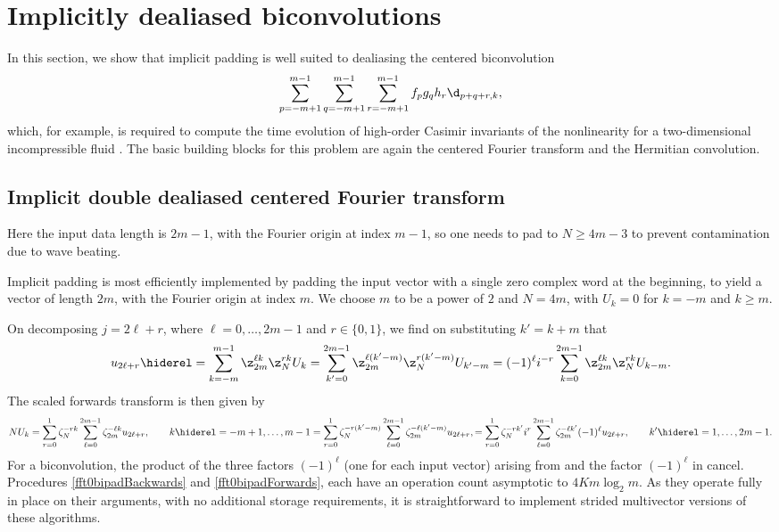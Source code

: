 \documentclass[final]{siamltex}
\def\bel{\begin{dmath}}
\def\eel{\end{dmath}}
\def\no{\hiderel}
\begin{document}
\section{Implicitly dealiased biconvolutions}\label{hyperconv}
In this section, we show that implicit padding is well suited to
dealiasing the centered biconvolution
$$
\sum_{p=-m+1}^{m-1}\sum_{q=-m+1}^{m-1}\sum_{r=-m+1}^{m-1} f_p g_q h_r\d_{p+q+r,k},
$$
which, for example, is required to compute the time evolution of high-order
Casimir invariants of the nonlinearity for a two-dimensional incompressible
fluid \cite{Bowman10}. The basic building blocks for this problem are again
the centered Fourier transform and the Hermitian convolution.
\subsection{Implicit double dealiased centered Fourier transform}
\label{fft0bi}
Here the input data length is $2m-1$, with the Fourier origin at index
$m-1$, so one needs to pad to $N\ge 4m-3$ to prevent contamination due to
wave beating.

Implicit padding is most efficiently implemented by padding the input
vector with a single zero complex word at the beginning, to yield a vector
of length $2m$, with the Fourier origin at index $m$. We choose $m$ to be
a power of $2$ and $N=4m$, with $U_k=0$ for $k=-m$ and $k\ge m$. 

On decomposing $j=2\ell+r$, where $\ell=0,\ldots, 2m-1$ and $r\in\{0,1\}$,
we find on substituting $k'=k+m$ that
\bel
u_{2\ell +r}\no=\sum_{k=-m}^{m-1}\z_{2m}^{\ell k} \z_N^{rk} U_k
=\sum_{k'=0}^{2m-1}\z_{2m}^{\ell (k'-m)} \z_N^{r(k'-m)} U_{k'-m}
=(-1)^\ell i^{-r}\sum_{k=0}^{2m-1}\z_{2m}^{\ell k} \z_N^{rk} U_{k-m}.
\label{fft0bibackwards}
\eel
The scaled forwards transform is then given by
\bel
NU_k=\sum_{r=0}^{1}\zeta_N^{-rk}\sum_{\ell=0}^{2m-1}\zeta_{2m}^{-\ell k} u_{2\ell+r},
\qquad k\no =-m+1,\ldots,m-1
=\sum_{r=0}^{1}\zeta_N^{-r(k'-m)}\sum_{\ell=0}^{2m-1}\zeta_{2m}^{-\ell (k'-m)} u_{2\ell+r},
=\sum_{r=0}^{1}\zeta_N^{-rk'}i^r\sum_{\ell=0}^{2m-1}\zeta_{2m}^{-\ell k'}(-1)^\ell u_{2\ell+r},
\qquad k'\no =1,\ldots,2m-1.\label{fft0biforwards}
\eel
For a biconvolution, the product of the three factors $(-1)^\ell$
(one for each input vector) arising from 
and the factor $(-1)^\ell$ in  cancel.
Procedures \ref{fft0bipadBackwards} and \ref{fft0bipadForwards},
each have an operation count asymptotic to $4Km\log_2 m$. As they
operate fully in place on their arguments, with no additional storage
requirements, it is straightforward to implement strided multivector
versions of these algorithms.
\end{document}

